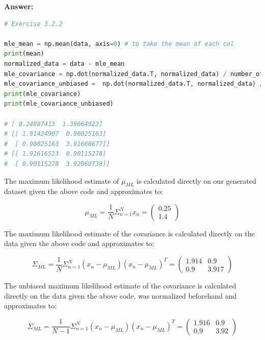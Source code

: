 \documentclass[a4paper]{article}
\begin{document}
\textbf{Answer:}\\


\begin{lstlisting}[language=Python]
# Exercise 3.2.2

mle_mean = np.mean(data, axis=0) # to take the mean of each col
print(mean)
normalized_data = data - mle_mean
mle_covariance = np.dot(normalized_data.T, normalized_data) / number_of_datapoints
mle_covariance_unbiased =  np.dot(normalized_data.T, normalized_data) / (number_of_datapoints - 1)
print(mle_covariance)
print(mle_covariance_unbiased)

# [ 0.24887413  1.39664922]
# [[ 1.91424907  0.90025163]
#  [ 0.90025163  3.91668677]]
# [[ 1.91616523  0.90115278]
#  [ 0.90115278  3.92060738]]
\end{lstlisting}

\vspace{1em}

The maximum likelihood estimate of $\mu_{ML}$ is calculated directly on our generated dataset given the above code and approximates to:

\begin{equation*}
	\mu_{ML} = \frac{1}{N} \Sigma^N_{n=1} x_n = \begin{pmatrix}
	0.25\\1.4
	\end{pmatrix}
\end{equation*}

The maximum likelihood estimate of the covariance is calculated directly on the data given the above code and approximates to:

\begin{equation*}
	\Sigma_{ML} = \frac{1}{N} \Sigma^N_{n=1} (x_n - \mu_{ML})(x_n - \mu_{ML})^T = \begin{pmatrix}
	1.914 & 0.9\\0.9 & 3.917
	\end{pmatrix}
\end{equation*}

The unbiased maximum likelihood estimate of the covariance is calculated directly on the data given the above code, was normalized beforehand and approximates to:

\begin{equation*}
	\Sigma_{ML} = \frac{1}{N-1} \Sigma^N_{n=1} (x_n - \mu_{ML})(x_n - \mu_{ML})^T = \begin{pmatrix}
	1.916 & 0.9\\0.9 & 3.92
	\end{pmatrix}
\end{equation*}
\end{document}
